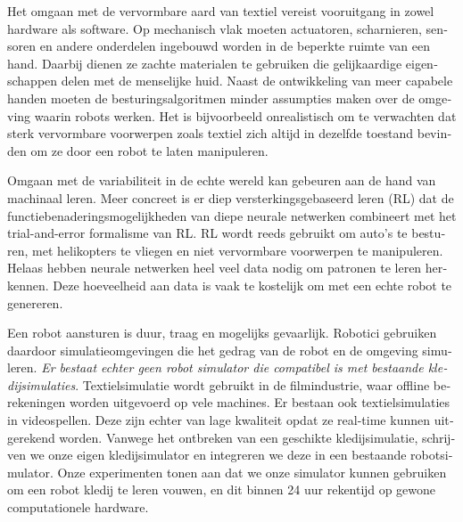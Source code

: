 \documentclass[\home/main.tex]{subfiles}
\begin{document}
\begin{otherlanguage}{dutch}
Het omgaan met de vervormbare aard van textiel vereist vooruitgang in zowel hardware als software. 
Op mechanisch vlak moeten actuatoren, scharnieren, sensoren en andere onderdelen ingebouwd worden in de beperkte ruimte van een hand. Daarbij dienen ze zachte materialen te gebruiken die gelijkaardige eigenschappen delen met de menselijke huid. Naast de ontwikkeling van meer capabele handen moeten de besturingsalgoritmen minder assumpties maken over de omgeving waarin robots werken. Het is bijvoorbeeld onrealistisch om te verwachten dat sterk vervormbare voorwerpen zoals textiel zich altijd in dezelfde toestand bevinden om ze door een robot te laten manipuleren.

Omgaan met de variabiliteit in de echte wereld kan gebeuren aan de hand van machinaal leren. Meer concreet is er diep versterkingsgebaseerd leren (RL) dat de functiebenaderingsmogelijkheden van diepe neurale netwerken combineert met het trial-and-error formalisme van \gls{RL}. RL wordt reeds gebruikt om auto's te besturen, met helikopters te vliegen en niet vervormbare voorwerpen te manipuleren. Helaas hebben neurale netwerken heel veel data nodig om patronen te leren herkennen. Deze hoeveelheid aan data is vaak te kostelijk om met een echte robot te genereren.


Een robot aansturen is duur, traag en mogelijks gevaarlijk. Robotici gebruiken daardoor simulatieomgevingen die het gedrag van de robot en de omgeving simuleren. \emph{Er bestaat echter geen robot simulator die compatibel is met bestaande kledijsimulaties}. 
Textielsimulatie wordt gebruikt in de filmindustrie, waar offline berekeningen worden uitgevoerd op vele machines. Er bestaan ook textielsimulaties in videospellen. Deze zijn echter van lage kwaliteit opdat ze real-time kunnen uitgerekend worden. Vanwege het ontbreken van een geschikte kledijsimulatie, schrijven we onze eigen kledijsimulator en integreren we deze in een bestaande robotsimulator. Onze experimenten tonen aan dat we onze simulator kunnen gebruiken om een robot kledij te leren vouwen, en dit binnen 24 uur rekentijd op gewone computationele hardware. 


\end{otherlanguage}
\end{document}
